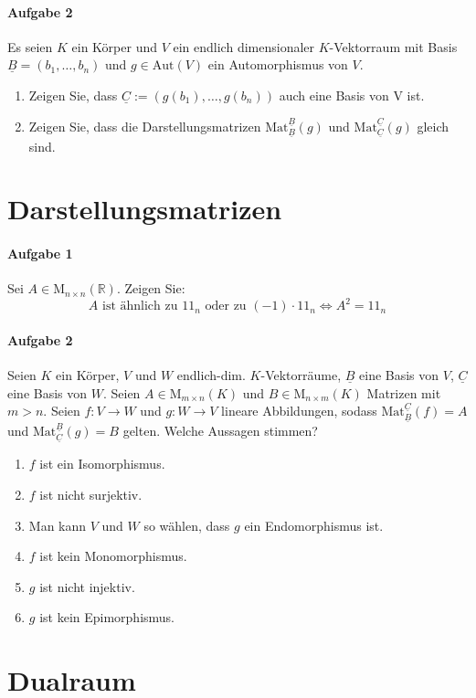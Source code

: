 \documentclass{scrartcl}
\begin{document}
	\paragraph{Aufgabe 2}
	Es seien $K$ ein Körper und $V$ ein endlich dimensionaler $K$-Vektorraum
	mit Basis $\underline{B}=(b_1,\dots,b_n)$
	und $g\in\text{Aut}(V)$ ein Automorphismus von $V$.
	\begin{enumerate}[label=(\alph*)]
		\item Zeigen Sie, dass $\underline{C}:=(g(b_1),\dots,g(b_n))$ auch eine Basis von V ist.
		\item Zeigen Sie, dass die Darstellungsmatrizen
			$\text{Mat}_{\underline{B}}^{\underline{B}}(g)$
			und $\text{Mat}_{\underline{C}}^{\underline{C}}(g)$ gleich sind.
	\end{enumerate}
	\section{Darstellungsmatrizen}
	\paragraph{Aufgabe 1}
	Sei $A\in \text{M}_{n\times n}(\mathbb{R})$. Zeigen Sie:
	\[A \text{ ist ähnlich zu } 1\!\!1_n \text{ oder zu } (-1)\cdot1\!\!1_n
	\Leftrightarrow A^2=1\!\!1_n\]
	\paragraph{Aufgabe 2}
	Seien $K$ ein Körper, $V$ und $W$ endlich-dim. $K$-Vektorräume,
	$\underline{B}$ eine Basis von $V$, $\underline{C}$ eine Basis von $W$.
	Seien $A\in\text{M}_{m\times n}(K)$ und $B\in\text{M}_{n\times m}(K)$ Matrizen mit $m>n$.
	Seien $f: V\to W$ und $g: W\to V$ lineare Abbildungen, sodass $\text{Mat}_{\underline{B}}^{\underline{C}}(f)=A$
	und $\text{Mat}_{\underline{C}}^{\underline{B}}(g)=B$ gelten.
	Welche Aussagen stimmen?
	\begin{enumerate}[label=(\alph*)]
		\item $f$ ist ein Isomorphismus.
		\item $f$ ist nicht surjektiv.
		\item Man kann $V$ und $W$ so wählen, dass $g$ ein Endomorphismus ist.
		\item $f$ ist kein Monomorphismus.
		\item $g$ ist nicht injektiv.
		\item $g$ ist kein Epimorphismus.
	\end{enumerate}
	\section{Dualraum}
\end{document}
